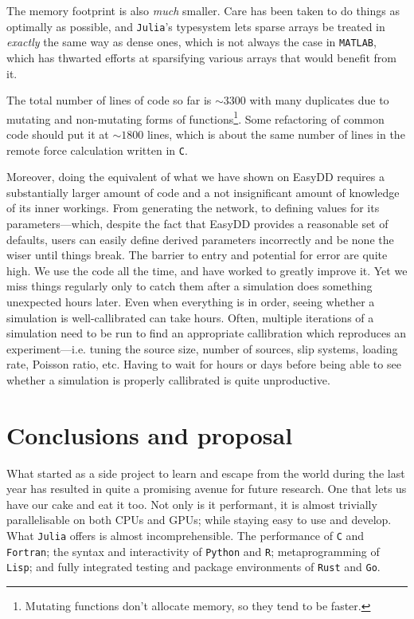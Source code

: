 The memory footprint is also \emph{much} smaller. Care has been taken to do things as optimally as possible, and \texttt{Julia}'s typesystem lets sparse arrays be treated in \emph{exactly} the same way as dense ones, which is not always the case in \texttt{MATLAB}, which has thwarted efforts at sparsifying various arrays that would benefit from it.

The total number of lines of code so far is $\sim 3300$ with many duplicates due to mutating and non-mutating forms of functions\footnote{Mutating functions don't allocate memory, so they tend to be faster.}. Some refactoring of common code should put it at $\sim 1800$ lines, which is about the same number of lines in the remote force calculation written in \texttt{C}.

Moreover, doing the equivalent of what we have shown on EasyDD requires a substantially larger amount of code and a not insignificant amount of knowledge of its inner workings. From generating the network, to defining values for its parameters---which, despite the fact that EasyDD provides a reasonable set of defaults, users can easily define derived parameters incorrectly and be none the wiser until things break. The barrier to entry and potential for error are quite high. We use the code all the time, and have worked to greatly improve it. Yet we miss things regularly only to catch them after a simulation does something unexpected hours later. Even when everything is in order, seeing whether a simulation is well-callibrated can take hours. Often, multiple iterations of a simulation need to be run to find an appropriate callibration which reproduces an experiment---i.e. tuning the source size, number of sources, slip systems, loading rate, Poisson ratio, etc. Having to wait for hours or days before being able to see whether a simulation is properly callibrated is quite unproductive.

\section{Conclusions and proposal}\label{s:concProp}

What started as a side project to learn and escape from the world during the last year has resulted in quite a promising avenue for future research. One that lets us have our cake and eat it too. Not only is it performant, it is almost trivially parallelisable on both CPUs and GPUs; while staying easy to use and develop. What \texttt{Julia} offers is almost incomprehensible. The performance of \texttt{C} and \texttt{Fortran}; the syntax and interactivity of \texttt{Python} and \texttt{R}; metaprogramming of \texttt{Lisp}; and fully integrated testing and package environments of \texttt{Rust} and \texttt{Go}.

